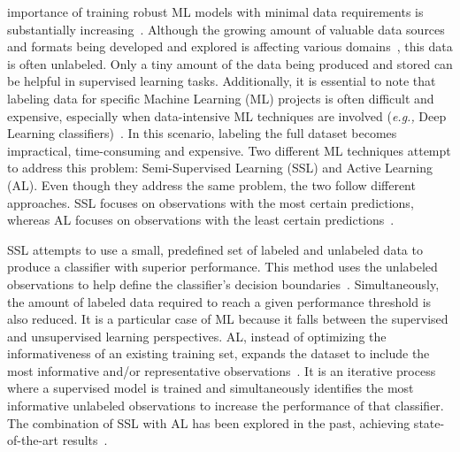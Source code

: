 \documentclass[10pt,journal,compsoc]{IEEEtran}
\begin{document}
\maketitle

\IEEEdisplaynontitleabstractindextext

%
\IEEEpeerreviewmaketitle




 importance of training robust ML models with minimal data
requirements is substantially increasing~\cite{Nath2021, Sverchkov2017,
Li2012}. Although the growing amount of valuable data sources and formats
being developed and explored is affecting various domains~\cite{Li2021}, this
data is often unlabeled. Only a tiny amount of the data being produced and
stored can be helpful in supervised learning tasks. Additionally, it is
essential to note that labeling data for specific Machine Learning (ML)
projects is often difficult and expensive, especially when data-intensive ML
techniques are involved (\textit{e.g.,} Deep Learning
classifiers)~\cite{Nath2021}. In this scenario, labeling the full dataset
becomes impractical, time-consuming and expensive. Two different ML techniques
attempt to address this problem: Semi-Supervised Learning (SSL) and Active
Learning (AL). Even though they address the same problem, the two follow
different approaches. SSL focuses on observations with the most certain
predictions, whereas AL focuses on observations with the least certain
predictions~\cite{Simeoni2020}.

SSL attempts to use a small, predefined set of labeled and unlabeled data to
produce a classifier with superior performance. This method uses the unlabeled
observations to help define the classifier's decision
boundaries~\cite{Van2020}. Simultaneously, the amount of labeled data required
to reach a given performance threshold is also reduced. It is a particular
case of ML because it falls between the supervised and unsupervised learning
perspectives. AL, instead of optimizing the informativeness of an existing
training set, expands the dataset to include the most informative and/or
representative observations~\cite{Sener2018}. It is an iterative process where
a supervised model is trained and simultaneously identifies the most
informative unlabeled observations to increase the performance of that
classifier. The combination of SSL with AL has been explored in the past,
achieving state-of-the-art results~\cite{Leng2013}.
 
\end{document}
